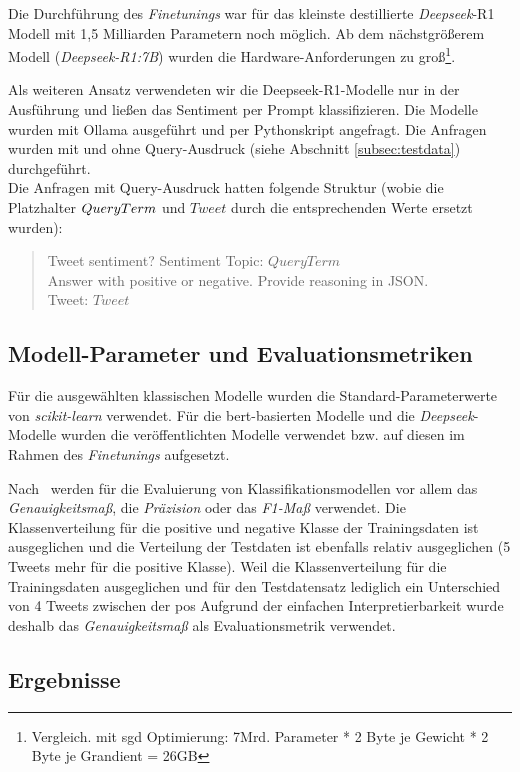 Die Durchführung des \textit{Finetunings} war für das kleinste destillierte \textit{Deepseek}-R1 Modell mit 1,5 Milliarden Parametern noch möglich.
Ab dem nächstgrößerem Modell (\textit{Deepseek-R1:7B}) wurden die Hardware-Anforderungen zu groß\footnote{Vergleich. mit \gls{sgd} Optimierung: 7Mrd. Parameter * 2 Byte je Gewicht * 2 Byte je Grandient = 26GB}.

Als weiteren Ansatz verwendeten wir die Deepseek-R1-Modelle nur in der Ausführung und ließen das Sentiment per Prompt klassifizieren.
Die Modelle wurden mit Ollama ausgeführt und per Pythonskript angefragt.
Die Anfragen wurden mit und ohne Query-Ausdruck (siehe Abschnitt \ref{subsec:testdata}) durchgeführt.\\
Die Anfragen mit Query-Ausdruck hatten folgende Struktur (wobie die Platzhalter $Query\-Term$ und $Tweet$ durch die entsprechenden Werte ersetzt wurden):
\begin{quote}
    Tweet sentiment? Sentiment Topic: $QueryTerm$\\
    Answer with positive or negative. Provide reasoning in JSON.\\
    Tweet: $Tweet$
\end{quote}

\subsection{Modell-Parameter und Evaluationsmetriken}

Für die ausgewählten klassischen Modelle wurden die Standard-Parameterwerte von \textit{scikit-learn} verwendet.
Für die \gls{bert}-basierten Modelle und die \textit{Deepseek}-Modelle wurden die veröffentlichten Modelle verwendet bzw. auf diesen im Rahmen des \textit{Finetunings} aufgesetzt.

Nach~\cite{wankhade2022survey} werden für die Evaluierung von Klassifikationsmodellen vor allem das \textit{Genauig\-keits\-maß}, die \textit{Präzision} oder das \textit{F1-Maß} verwendet.
Die Klassenverteilung für die positive und negative Klasse der Trainingsdaten ist ausgeglichen und die Verteilung der Testdaten ist ebenfalls relativ ausgeglichen (5 Tweets mehr für die positive Klasse).
Weil die Klassenverteilung für die Trainingsdaten ausgeglichen und für den Testdatensatz lediglich ein Unterschied von 4 Tweets zwischen der pos
Aufgrund der einfachen Interpretierbarkeit wurde deshalb das \textit{Genauigkeitsmaß} als Evaluationsmetrik verwendet.

\subsection{Ergebnisse}

